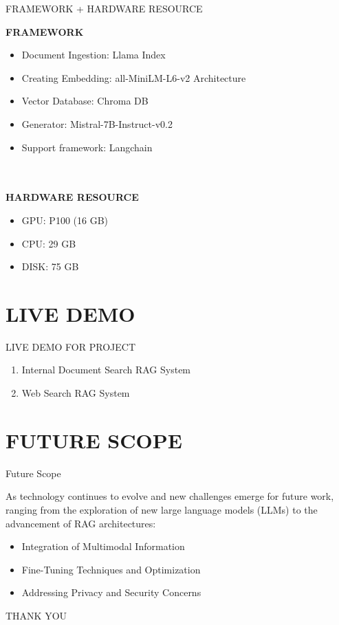 \documentclass{beamer}
\begin{document}
\begin{frame}{FRAMEWORK + HARDWARE RESOURCE}

\textbf{FRAMEWORK}
\begin{itemize}
    

\item Document Ingestion: Llama Index
\item Creating Embedding: all-MiniLM-L6-v2 Architecture
\item Vector Database: Chroma DB
\item Generator: Mistral-7B-Instruct-v0.2
\item Support framework: Langchain
\end{itemize}
\\ \\


\textbf{HARDWARE RESOURCE}
\begin{itemize}
    

\item GPU: P100 (16 GB)
\item CPU: 29 GB
\item DISK: 75 GB
\end{itemize}
\end{frame}







\section{LIVE DEMO}
\begin{frame}{}
    \centering
    \Huge %
    LIVE DEMO FOR PROJECT %

    \small
\begin{enumerate}
    \item Internal Document Search RAG System
    \item Web Search RAG System
\end{enumerate}
\end{frame}




\section{FUTURE SCOPE}

\begin{frame}{Future Scope}

As technology continues to evolve and new challenges emerge for future work, ranging from the exploration of new large language models (LLMs) to the advancement of RAG architectures: 
\begin{itemize}


    \item Integration of Multimodal Information
    \item Fine-Tuning Techniques and Optimization
    \item Addressing Privacy and Security Concerns
\end{itemize}
\end{frame}

\begin{frame}{}
    \centering
    \Huge %
    THANK YOU %


\end{frame}
\end{document}
